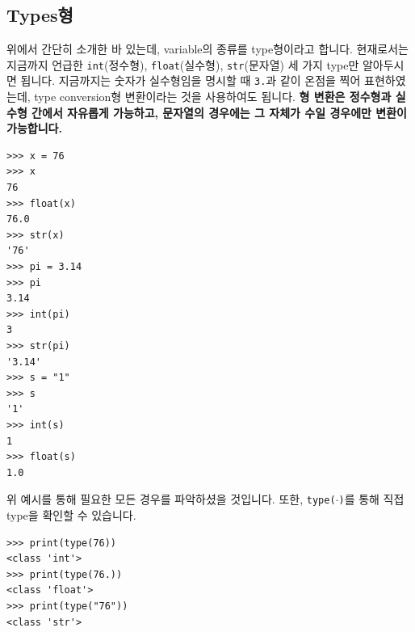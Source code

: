 \documentclass[../main.tex]{subfiles}
\begin{document}
\subsection{Types형}
위에서 간단히 소개한 바 있는데, variable의 종류를 type형이라고 합니다.
현재로서는 지금까지 언급한 \texttt{int}(정수형), \texttt{float}(실수형), \texttt{str}(문자열) 세 가지 type만 알아두시면 됩니다.
지금까지는 숫자가 실수형임을 명시할 때 \texttt{3.}과 같이 온점을 찍어 표현하였는데, type conversion형 변환이라는 것을 사용하여도 됩니다.
\textbf{형 변환은 정수형과 실수형 간에서 자유롭게 가능하고, 문자열의 경우에는 그 자체가 수일 경우에만 변환이 가능합니다.}
\begin{verbatim}
>>> x = 76
>>> x
76
>>> float(x)
76.0
>>> str(x)
'76'
>>> pi = 3.14
>>> pi
3.14
>>> int(pi)
3
>>> str(pi)
'3.14'
>>> s = "1"
>>> s
'1'
>>> int(s)
1
>>> float(s)
1.0
\end{verbatim}
위 예시를 통해 필요한 모든 경우를 파악하셨을 것입니다.
또한, \texttt{type($\cdot$)}를 통해 직접 type을 확인할 수 있습니다.
\begin{verbatim}
>>> print(type(76))
<class 'int'>
>>> print(type(76.))
<class 'float'>
>>> print(type("76"))
<class 'str'>
\end{verbatim}
\end{document}
